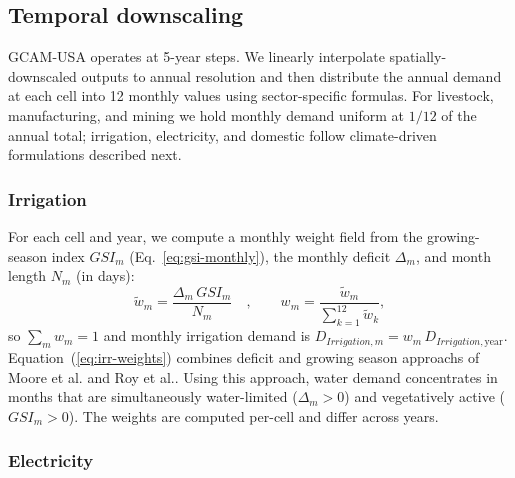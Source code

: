 \documentclass[fleqn,10pt]{wlscirep}
\begin{document}
\subsection*{Temporal downscaling}

GCAM-USA operates at 5-year steps. We linearly interpolate spatially-downscaled outputs to annual resolution and then distribute the annual demand at each cell into 12 monthly values using sector-specific formulas. For livestock, manufacturing, and mining we hold monthly demand uniform at $1/12$ of the annual total; irrigation, electricity, and domestic follow climate-driven formulations described next.

\subsubsection*{Irrigation}

For each cell and year, we compute a monthly weight field from the growing-season index $GSI_m$ (Eq.~\ref{eq:gsi-monthly}), the monthly deficit $\Delta_m$, and month length $N_m$ (in days):
\begin{equation}
\tilde{w}_m = \frac{\Delta_m \, GSI_m}{N_m}\quad, \qquad w_m = \frac{\tilde{w}_m}{\sum_{k=1}^{12}\tilde{w}_k},
\label{eq:irr-weights}
\end{equation}
so $\sum_m w_m = 1$ and monthly irrigation demand is $D_{Irrigation,m} = w_m \, D_{Irrigation,\mathrm{year}}$. Equation~(\ref{eq:irr-weights}) combines deficit and growing season approachs of Moore et al.\cite{Moore_2015} and Roy et al.\cite{Roy_2005}. Using this approach, water demand concentrates in months that are simultaneously water-limited ($\Delta_m > 0$) and vegetatively active ($GSI_m > 0$). The weights are computed per-cell and differ across years.

\subsubsection*{Electricity}
\end{document}

